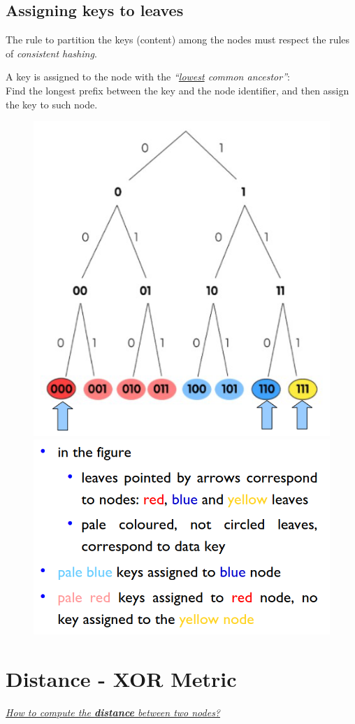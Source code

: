 \newpage
\subsection{Assigning keys to leaves}
The rule to partition the keys (content) among the nodes must respect the rules of \textit{consistent hashing}.

\begin{paracol}{2}
   \colfill
   \begin{definition}
      A key is assigned to the node with the
      \textit{``\ul{lowest} common ancestor''}:\\
      Find the longest prefix between the
      key and the node identifier, and then assign the key to such node.
   \end{definition}
   \colfill
   \switchcolumn
   \begin{figure}[htbp]
      \centering
      \includegraphics[width=0.45\columnwidth]{images/kademlia_leaves01.png}
      \includegraphics[width=0.45\columnwidth]{images/kademlia_leaves02.png}
      \label{fig:kademlia_leaves}
   \end{figure}
\end{paracol}

\section{Distance - XOR Metric}
\begin{center}
   \textit{\ul{How to compute the \textbf{distance} between two nodes?}}
\end{center}

